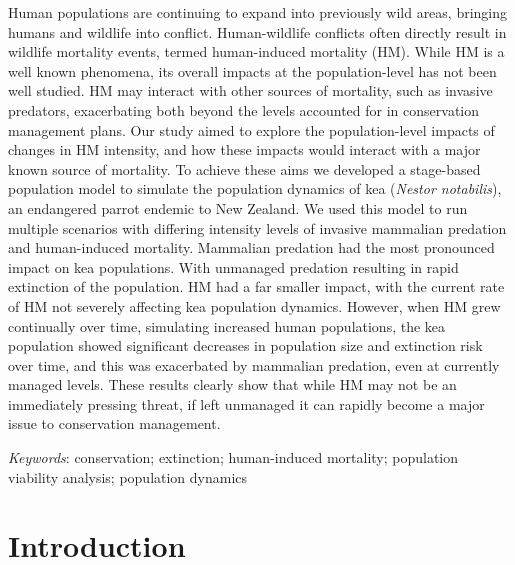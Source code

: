 \documentclass[11pt,]{article}
\renewenvironment{abstract}
 {{%
    \setlength{\leftmargin}{0mm}
    \setlength{\rightmargin}{\leftmargin}%
  }%
  \relax}
 {\endlist}
\begin{document}
\begin{abstract}

    \hbox{\vrule height .2pt width 39.14pc}

    \vskip 8.5pt %

\noindent Human populations are continuing to expand into previously wild areas,
bringing humans and wildlife into conflict. Human-wildlife conflicts
often directly result in wildlife mortality events, termed human-induced
mortality (HM). While HM is a well known phenomena, its overall impacts
at the population-level has not been well studied. HM may interact with
other sources of mortality, such as invasive predators, exacerbating
both beyond the levels accounted for in conservation management plans.
Our study aimed to explore the population-level impacts of changes in HM
intensity, and how these impacts would interact with a major known
source of mortality. To achieve these aims we developed a stage-based
population model to simulate the population dynamics of kea
(\emph{Nestor notabilis}), an endangered parrot endemic to New Zealand.
We used this model to run multiple scenarios with differing intensity
levels of invasive mammalian predation and human-induced mortality.
Mammalian predation had the most pronounced impact on kea populations.
With unmanaged predation resulting in rapid extinction of the
population. HM had a far smaller impact, with the current rate of HM not
severely affecting kea population dynamics. However, when HM grew
continually over time, simulating increased human populations, the kea
population showed significant decreases in population size and
extinction risk over time, and this was exacerbated by mammalian
predation, even at currently managed levels. These results clearly show
that while HM may not be an immediately pressing threat, if left
unmanaged it can rapidly become a major issue to conservation
management.


\vskip 8.5pt \noindent \emph{Keywords}: conservation; extinction; human-induced mortality; population viability
analysis; population dynamics \par

    \hbox{\vrule height .2pt width 39.14pc}



\end{abstract}


\vskip -8.5pt



\noindent  

\hypertarget{introduction}{%
\section{Introduction}\label{introduction}}
\end{document}
